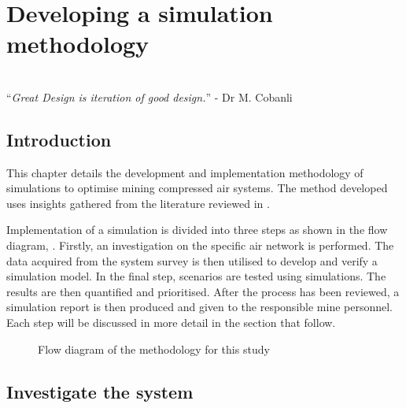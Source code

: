 \chapter{Developing a simulation methodology}
\thispagestyle{empty}
\vspace{38em}
\hrulefill
\\
\enquote{\textit{Great Design is iteration of good design.}} - Dr M. Cobanli\\
\newpage
\section{Introduction}
This chapter details the development and implementation methodology of simulations to optimise mining compressed air systems. The method developed uses insights gathered from the literature reviewed in .
\par 
Implementation of a simulation is divided into three steps as shown in the flow diagram, . Firstly, an investigation on the specific air network is performed. The data acquired from the system survey is then utilised to develop and verify a simulation model. In the final step, scenarios are tested using simulations. The results are then quantified and prioritised. After the process has been reviewed, a simulation report is then produced and given to the responsible mine personnel. Each step will be discussed in more detail in the section that follow.

\begin{figure}[h]
	\centering
	\caption{Flow diagram of the methodology for this study}
	\label{fig: Methodology}
\end{figure}
\section{Investigate the system}

